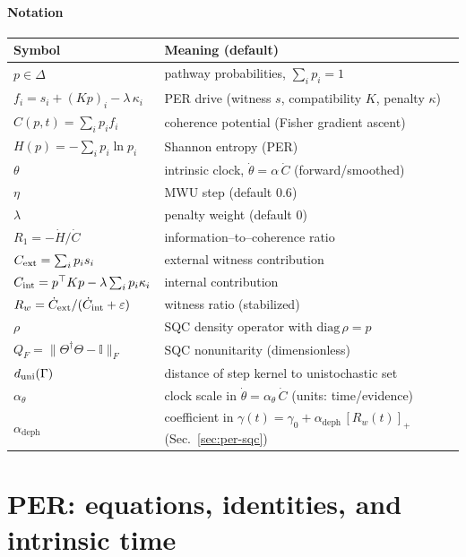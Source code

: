 \documentclass[11pt]{article}
\begin{document}
\paragraph{Notation}
\begin{center}
\begin{tabular}{@{}ll@{}}
\toprule
Symbol & Meaning (default) \\ \midrule
$p\in\Delta$ & pathway probabilities, $\sum_i p_i=1$ \\
$f_i=s_i+(Kp)_i-\lambda\,\kappa_i$ & PER drive (witness $s$, compatibility $K$, penalty $\kappa$) \\
$C(p,t)=\sum_i p_i f_i$ & coherence potential (Fisher gradient ascent) \\
$H(p)=-\sum_i p_i\ln p_i$ & Shannon entropy (PER) \\
$\theta$ & intrinsic clock, $\dot\theta=\alpha\,\dot C$ (forward/smoothed) \\
$\eta$ & MWU step (default $0.6$) \\
$\lambda$ & penalty weight (default $0$) \\
$R_1=-\dot H/\dot C$ & information–to–coherence ratio \\
$C_{\rm ext}=\sum_i p_i s_i$ & external witness contribution \\
$C_{\rm int}=p^\top K p-\lambda\sum_i p_i\kappa_i$ & internal contribution \\
$R_w=\dot C_{\rm ext}/(\dot C_{\rm int}+\varepsilon)$ & witness ratio (stabilized) \\
$\rho$ & SQC density operator with $\mathrm{diag}\,\rho=p$ \\
$Q_F=\|\Theta^\dagger\Theta-\mathbb I\|_F$ & SQC nonunitarity (dimensionless) \\
$d_{\rm uni}(\Gamma)$ & distance of step kernel to unistochastic set \\
$\alpha_\theta$ & clock scale in $\dot\theta = \alpha_\theta\,\dot C$ (units: time/evidence) \\
$\alpha_{\text{deph}}$ & coefficient in $\gamma(t)=\gamma_0+\alpha_{\text{deph}}\,[R_w(t)]_+$ (Sec.~\ref{sec:per-sqc}) \\
\bottomrule
\end{tabular}
\end{center}

\section{PER: equations, identities, and intrinsic time}\label{sec:per-core}
\end{document}
